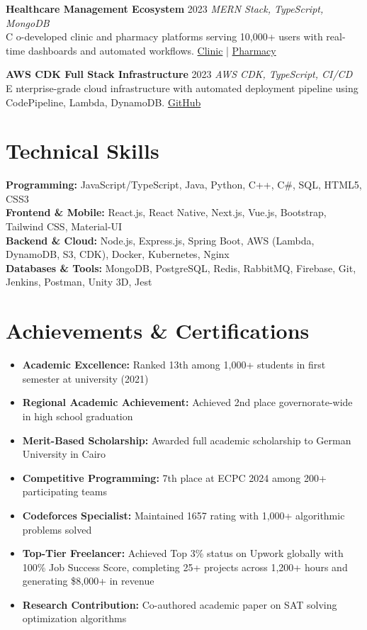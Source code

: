 \documentclass[8pt,a4paper]{article}
\newcommand{\cventry}[4]{%
    \textbf{#1} \hfill {\small\color{secondarycolor} #2} \hfill {\footnotesize\textit{#3}}\\
    #4
    \vspace{0.02em}
}
\newcommand{\skillsection}[2]{%
    \textbf{#1:} #2\\[-0.02em]
}
\begin{document}
\cventry{Healthcare Management Ecosystem}{2023}{MERN Stack, TypeScript, MongoDB}
Co-developed clinic and pharmacy platforms serving 10,000+ users with real-time dashboards and automated workflows. \href{https://github.com/advanced-computer-lab-2023/Copilot-and-Sons-Clinic}{Clinic} | \href{https://github.com/advanced-computer-lab-2023/Copilot-and-Sons-Pharmacy}{Pharmacy}

\cventry{AWS CDK Full Stack Infrastructure}{2023}{AWS CDK, TypeScript, CI/CD}
Enterprise-grade cloud infrastructure with automated deployment pipeline using CodePipeline, Lambda, DynamoDB. \href{https://github.com/ramezlahzy/cdk_fullstack_app}{GitHub}


\section{Technical Skills}

\skillsection{Programming}{JavaScript/TypeScript, Java, Python, C++, C\#, SQL, HTML5, CSS3}
\skillsection{Frontend \& Mobile}{React.js, React Native, Next.js, Vue.js, Bootstrap, Tailwind CSS, Material-UI}
\skillsection{Backend \& Cloud}{Node.js, Express.js, Spring Boot, AWS (Lambda, DynamoDB, S3, CDK), Docker, Kubernetes, Nginx}
\skillsection{Databases \& Tools}{MongoDB, PostgreSQL, Redis, RabbitMQ, Firebase, Git, Jenkins, Postman, Unity 3D, Jest}

\section{Achievements \& Certifications}
\begin{itemize}
    \item \textbf{Academic Excellence:} Ranked 13th among 1,000+ students in first semester at university (2021)
    \item \textbf{Regional Academic Achievement:} Achieved 2nd place governorate-wide in high school graduation
    \item \textbf{Merit-Based Scholarship:} Awarded full academic scholarship to German University in Cairo
    \item \textbf{Competitive Programming:} 7th place at ECPC 2024 among 200+ participating teams
    \item \textbf{Codeforces Specialist:} Maintained 1657 rating with 1,000+ algorithmic problems solved
    \item \textbf{Top-Tier Freelancer:} Achieved Top 3\% status on Upwork globally with 100\% Job Success Score, completing 25+ projects across 1,200+ hours and generating \$8,000+ in revenue
    \item \textbf{Research Contribution:} Co-authored academic paper on SAT solving optimization algorithms
\end{itemize}
\end{document}
